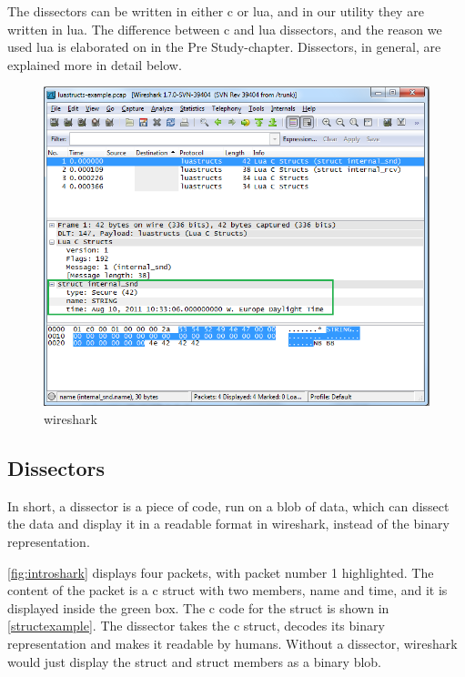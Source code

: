 The \glspl{dissector} can be written in either \Gls{c} or \Gls{lua}, and in our \gls{utility} they are written in \Gls{lua}.
The difference between \Gls{c} and \Gls{lua} \glspl{dissector}, and the reason we used \Gls{lua} is elaborated on in the Pre Study-chapter.
Dissectors, in general, are explained more in detail below.

\begin{figure}[ht]
	\includegraphics[width=\textwidth]{./img/wireshark_example.png}
	\caption{\Gls{wireshark}\label{fig:introshark}}
\end{figure}

\subsection*{Dissectors}
In short, a \gls{dissector} is a piece of code, run on a blob of data, which can dissect the
data and display it in a readable format in \Gls{wireshark}, instead of the \gls{binary} representation.

\autoref{fig:introshark} displays four \glspl{packet}, with \gls{packet} number 1 highlighted.
The content of the \gls{packet} is a \Gls{c} \gls{struct} with two \glspl{member}, name and time, and it is displayed inside the green box.
The \Gls{c} code for the \gls{struct} is shown in \autoref{structexample}.
The \gls{dissector} takes the \Gls{c} \gls{struct}, decodes its \gls{binary} representation and makes it readable by humans.
Without a \gls{dissector}, \Gls{wireshark} would just display the \gls{struct} and \gls{struct} \glspl{member} as a \gls{binary} blob.

